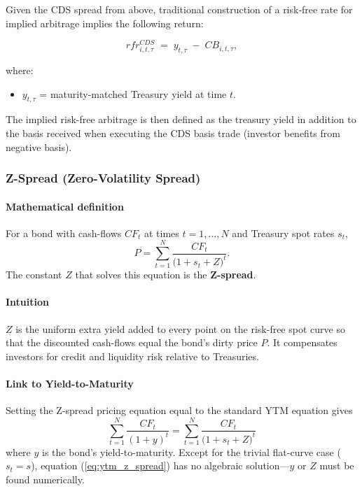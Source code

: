 \documentclass{article}
\begin{document}
\begin{appendices}
Given the CDS spread from above, traditional construction of a risk‐free rate for implied arbitrage implies the following return:

\begin{equation}
  rfr^{CDS}_{i,t,\tau} \;=\; y_{t,\tau} \;-\; CB_{i,t,\tau},
\end{equation}

where:
\begin{itemize}
  \item $y_{t,\tau}$ = maturity‐matched Treasury yield at time $t$.
\end{itemize}

The implied risk-free arbitrage is then defined as the treasury yield in addition to the basis received when executing the CDS basis trade (investor benefits from negative basis).

\subsubsection{Z-Spread (Zero-Volatility Spread)}

\paragraph*{Mathematical definition}
For a bond with cash-flows $CF_t$ at times $t=1,\dots,N$ and Treasury spot rates $s_t$,
\begin{equation*}
P = \sum_{t=1}^{N} \frac{CF_t}{\bigl(1+s_t+Z\bigr)^t}.
\end{equation*}
The constant $Z$ that solves this equation is the \textbf{Z-spread}.

\paragraph*{Intuition}
$Z$ is the uniform extra yield added to every point on the risk-free spot curve so that the discounted cash-flows equal the bond's dirty price $P$. It compensates investors for credit and liquidity risk relative to Treasuries.

\paragraph*{Link to Yield-to-Maturity}
Setting the Z-spread pricing equation equal to the standard YTM equation gives
\begin{equation}
\label{eq:ytm_z_spread}
\sum_{t=1}^{N}\frac{CF_t}{(1+y)^t}
=\sum_{t=1}^{N}\frac{CF_t}{\bigl(1+s_t+Z\bigr)^t}
\end{equation}
where $y$ is the bond's yield-to-maturity. Except for the trivial flat-curve case ($s_t=s$), equation (\ref{eq:ytm_z_spread}) has no algebraic solution—$y$ or $Z$ must be found numerically.


\end{appendices}
\end{document}
